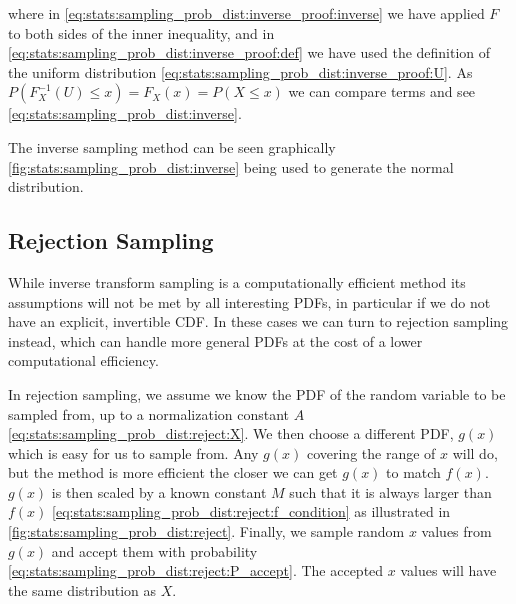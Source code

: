 \noindent where in \cref{eq:stats:sampling_prob_dist:inverse_proof:inverse} we have applied $F$ to both sides of the inner inequality,
and in \cref{eq:stats:sampling_prob_dist:inverse_proof:def} we have used the definition of the uniform distribution \cref{eq:stats:sampling_prob_dist:inverse_proof:U}.
As $P\left(F^{-1}_{X}\left(U\right) \leq x\right) = F_{X}\left(x\right) = P\left(X \leq x\right)$
we can compare terms and see \cref{eq:stats:sampling_prob_dist:inverse}.

The inverse sampling method can be seen graphically \cref{fig:stats:sampling_prob_dist:inverse} being used to generate the normal distribution.


\subsection{Rejection Sampling}
\label{misc:sampling_prob_dist:reject}

While inverse transform sampling is a computationally efficient method
its assumptions will not be met by all interesting PDFs,
in particular if we do not have an explicit, invertible CDF.
In these cases we can turn to rejection sampling instead,
which can handle more general PDFs at the cost of a lower computational efficiency.

In rejection sampling, we assume we know the PDF of the random variable to be sampled from,
up to a normalization constant $A$ \cref{eq:stats:sampling_prob_dist:reject:X}.
We then choose a different PDF, $g\left(x\right)$ which is easy for us to sample from.
Any $g\left(x\right)$ covering the range of $x$ will do,
but the method is more efficient the closer we can get $g\left(x\right)$ to match $f\left(x\right)$.
$g\left(x\right)$ is then scaled by a known constant $M$
such that it is always larger than $f\left(x\right)$ \cref{eq:stats:sampling_prob_dist:reject:f_condition}
as illustrated in \cref{fig:stats:sampling_prob_dist:reject}.
Finally, we sample random $x$ values from $g\left(x\right)$ and accept them with probability \cref{eq:stats:sampling_prob_dist:reject:P_accept}.
The accepted $x$ values will have the same distribution as $X$.

